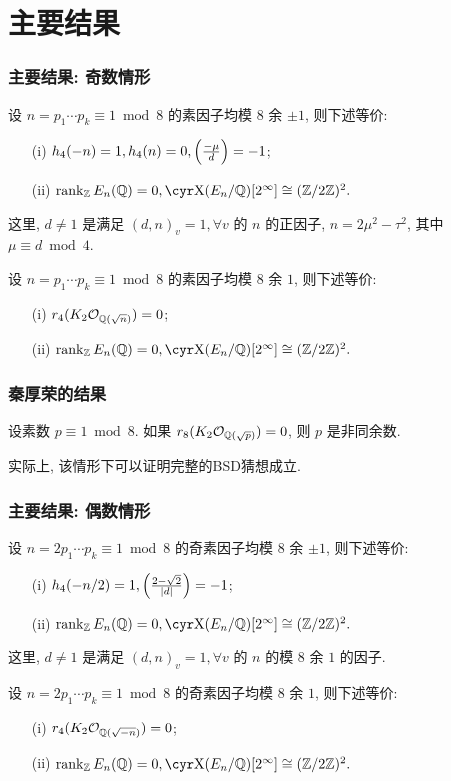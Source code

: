\documentclass{beamer}
\begin{document}
\section{主要结果}
\begin{frame}
\frametitle{主要结果: 奇数情形}
\begin{theorem}
设 $n=p_1\cdots p_k\equiv 1\bmod 8$ 的素因子均模 $8$ 余 $\pm1$, 
则下述等价:
\begin{itemize}
\item[(i)] $h_4(-n)=1, h_4(n)=0, \Bigl(\frac{{-\mu}}{d}\Bigr)=-1$;
\item[(ii)] $\rank_\BZ E_n(\BQ)=0,\Sha(E_n/\BQ)[2^\infty]\cong(\BZ/2\BZ)^2.$
\end{itemize}
这里, $d\neq 1$ 是满足 $(d,n)_v=1,\forall v$ 的 $n$ 的正因子, $n=2\mu^2-\tau^2$, 其中 $\mu\equiv d\bmod4$.
\end{theorem} 

\begin{corollary}
设 $n=p_1\cdots p_k\equiv 1\bmod 8$ 的素因子均模 $8$ 余 $1$, 
则下述等价:
\begin{itemize}
\item[(i)] $r_4(K_2{\mathcal{O}}_{{\mathbb{Q}}(\sqrt{n})})=0$;
\item[(ii)] $\rank_\BZ E_n(\BQ)=0,\Sha(E_n/\BQ)[2^\infty]\cong(\BZ/2\BZ)^2.$
\end{itemize}
\end{corollary}
\end{frame}

\begin{frame}
\frametitle{秦厚荣的结果}
\begin{theorem}[秦厚荣, 2021]
设素数 $p\equiv 1\bmod 8$. 如果 $r_8(K_2{\mathcal{O}}_{{\mathbb{Q}}(\sqrt{p})})=0$, 则 $p$ 是非同余数.
\end{theorem}
实际上, 该情形下可以证明完整的BSD猜想成立.
\end{frame}

\begin{frame}
\frametitle{主要结果: 偶数情形}
\begin{theorem}
设 $n=2p_1\cdots p_k\equiv 1\bmod 8$ 的奇素因子均模 $8$ 余 $\pm1$, 
则下述等价:
\begin{itemize}
\item[(i)] $h_4(-n/2)=1, \Bigl(\frac{{2-\sqrt{2}}}{|d|}\Bigr)=-1$;
\item[(ii)] $\rank_\BZ E_n(\BQ)=0,\Sha(E_n/\BQ)[2^\infty]\cong(\BZ/2\BZ)^2.$
\end{itemize}
这里, $d\neq 1$ 是满足 $(d,n)_v=1,\forall v$ 的 $n$ 的模 $8$ 余 $1$ 的因子.
\end{theorem} 

\begin{corollary}
设 $n=2p_1\cdots p_k\equiv 1\bmod 8$ 的奇素因子均模 $8$ 余 $1$, 
则下述等价:
\begin{itemize}
\item[(i)] $r_4(K_2{\mathcal{O}}_{{\mathbb{Q}}(\sqrt{-n})})=0$;
\item[(ii)] $\rank_\BZ E_n(\BQ)=0,\Sha(E_n/\BQ)[2^\infty]\cong(\BZ/2\BZ)^2.$
\end{itemize}
\end{corollary}
\end{frame}
\end{document}
